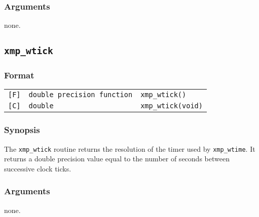 \subsubsection*{Arguments}
    none.


\subsection{\tt xmp\_wtick}

\subsubsection*{Format}

\begin{tabular}{lll}

\verb![F]!&  {\tt double precision function}& {\tt xmp\_wtick()}\\

\verb![C]!&  {\tt double}& {\tt xmp\_wtick(void)}

\end{tabular}

\subsubsection*{Synopsis}
    The {\tt xmp\_wtick} routine returns the resolution of the timer
    used by {\tt xmp\_wtime}. 
    It returns a double precision value equal to the number of seconds 
    between successive clock ticks.

\subsubsection*{Arguments}
    none.


%
%
%
%
%
%
%
%

